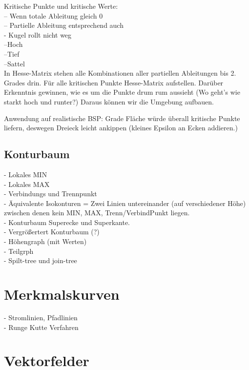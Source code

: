 \documentclass{article}
\begin{document}
Kritische Punkte und kritische Werte:\\
-- Wenn totale Ableitung gleich 0\\
-- Partielle Ableitung entsprechend auch\\
- Kugel rollt nicht weg\\
--Hoch\\
--Tief\\
--Sattel\\

In Hesse-Matrix stehen alle Kombinationen aller partiellen Ableitungen bis 2. Grades drin.
Für alle kritischen Punkte Hesse-Matrix aufstellen. Darüber Erkenntnis gewinnen, wie es um die Punkte drum rum aussieht (Wo geht's wie starkt hoch und runter?) Daraus können wir die Umgebung aufbauen.

Anwendung auf realistische BSP: Grade Fläche würde überall kritische Punkte liefern, deswegen Dreieck leicht ankippen (kleines Epsilon an Ecken addieren.)

\subsection{Konturbaum}
- Lokales MIN\\
- Lokales MAX\\
- Verbindungs und Trennpunkt\\

- Äquivalente Isokonturen = Zwei Linien untereinander (auf verschiedener Höhe) zwischen denen kein MIN, MAX, Trenn/VerbindPunkt liegen.\\

- Konturbaum Superecke und Superkante.\\

- Vergrößertert Konturbaum (?)\\
- Höhengraph (mit Werten)\\
- Teilgrph\\
- Spilt-tree und join-tree\\






\pagebreak
\section{Merkmalskurven}
- Stromlinien, Pfadlinien\\
- Runge Kutte Verfahren

\pagebreak
\section{Vektorfelder}
\end{document}
